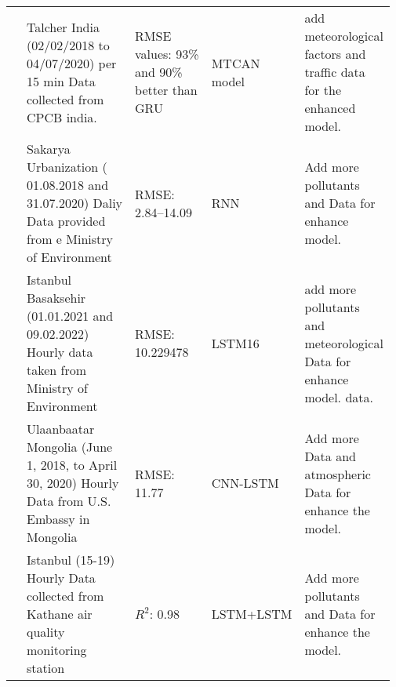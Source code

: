 \begin{landscape}
{\begin{longtable}[h!]{ p{0.04\linewidth} p{0.33\linewidth} p{0.22\linewidth} p{0.17\linewidth} p{0.21\linewidth} }
 \cite{samal2021multi}  & Talcher India (02/02/2018 to   04/07/2020) per 15 min Data collected from CPCB india.                    & RMSE values:  93\%  and 90\% better than GRU                                                              & MTCAN model                                                         & add meteorological factors and traffic data for the enhanced model.                                                               \\


 \cite{kurnaz2022prediction}          & Sakarya Urbanization (   01.08.2018 and 31.07.2020) Daliy Data provided from e Ministry of Environment   & RMSE:  2.84–14.09                                                                                       & RNN                                                                 & Add more pollutants and Data for enhance model.    \\



 \cite{das2022prediction}           & Istanbul Basaksehir (01.01.2021   and 09.02.2022) Hourly data taken from Ministry of Environment         & RMSE: 10.229478                                                                                          & LSTM16                                                              & add more pollutants and  meteorological Data for enhance model. data.                                          \\
\cite{natsagdorj2023prediction}              & Ulaanbaatar Mongolia  (June 1,  2018, to  April 30,  2020) Hourly Data from U.S.   Embassy in Mongolia      & RMSE: 11.77                                                                                              & CNN-LSTM                                                            & Add more Data and atmospheric Data for enhance the model.  \\
 \cite{eren2023predicting}         & Istanbul (15-19) Hourly Data collected from Kathane air quality monitoring station                     & $R^2$:  0.98                                                                                               & LSTM+LSTM                                                           & Add more pollutants and Data for enhance the model.           \\





\end{longtable}}
\end{landscape}
